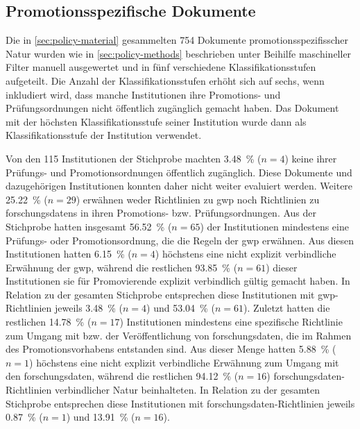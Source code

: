\subsection{Promotionsspezifische Dokumente}\label{sec:policy-results-specific}
Die in \cref{sec:policy-material} gesammelten \num{754} Dokumente promotionsspezifisscher Natur wurden wie in \cref{sec:policy-methods} beschrieben unter Beihilfe maschineller Filter manuell ausgewertet und in fünf verschiedene Klassifikationsstufen aufgeteilt.
Die Anzahl der Klassifikationsstufen erhöht sich auf sechs, wenn inkludiert wird, dass manche Institutionen ihre Promotions- und Prüfungsordnungen nicht öffentlich zugänglich gemacht haben.
Das Dokument mit der höchsten Klassifikationsstufe seiner Institution wurde dann als Klassifikationsstufe der Institution verwendet.

Von den \num{115} Institutionen der Stichprobe machten \SI{3,48}{\percent} ($n=\num{4}$) keine ihrer Prüfungs- und Promotionsordnungen öffentlich zugänglich.
Diese Dokumente und dazugehörigen Institutionen konnten daher nicht weiter evaluiert werden.
Weitere \SI{25,22}{\percent} ($n=\num{29}$) erwähnen weder Richtlinien zu \gls{gwp} noch Richtlinien zu \glspl{forschungsdaten} in ihren Promotions- bzw. Prüfungsordnungen.
Aus der Stichprobe hatten insgesamt \SI{56,52}{\percent} ($n=\num{65}$) der Institutionen mindestens eine Prüfungs- oder Promotionsordnung, die die Regeln der \gls{gwp} erwähnen.
Aus diesen Institutionen hatten \SI{6,15}{\percent} ($n=\num{4}$) höchstens eine nicht explizit verbindliche Erwähnung der \gls{gwp}, während die restlichen \SI{93,85}{\percent} ($n=\num{61}$) dieser Institutionen sie für Promovierende explizit verbindlich gültig gemacht haben.
In Relation zu der gesamten Stichprobe entsprechen diese Institutionen mit \gls{gwp}-Richtlinien jeweils \SI{3,48}{\percent} ($n=\num{4}$) und \SI{53,04}{\percent} ($n=\num{61}$).
Zuletzt hatten die restlichen \SI{14,78}{\percent} ($n=\num{17}$) Institutionen mindestens eine spezifische Richtlinie zum Umgang mit bzw. der Veröffentlichung von \gls{forschungsdaten}, die im Rahmen des Promotionsvorhabens entstanden sind.
Aus dieser Menge hatten \SI{5,88}{\percent} ($n=\num{1}$) höchstens eine nicht explizit verbindliche Erwähnung zum Umgang mit den \gls{forschungsdaten}, während die restlichen \SI{94,12}{\percent} ($n=\num{16}$) \gls{forschungsdaten}-Richtlinien verbindlicher Natur beinhalteten.
In Relation zu der gesamten Stichprobe entsprechen diese Institutionen mit \gls{forschungsdaten}-Richtlinien jeweils \SI{0,87}{\percent} ($n=\num{1}$) und \SI{13,91}{\percent} ($n=\num{16}$).
\pagebreak

